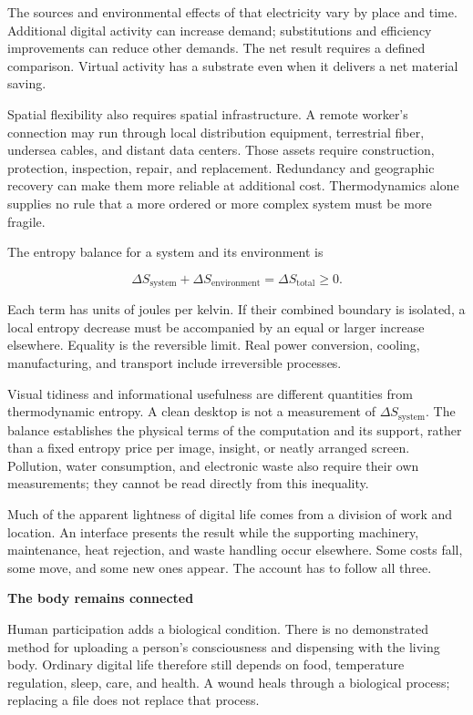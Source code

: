\documentclass[11pt,openany]{book}
\newcommand{\subhead}[1]{\par\medskip\noindent\textbf{#1}\par\nobreak\smallskip}
\begin{document}
The sources and environmental effects of that electricity vary by place and time. Additional digital activity can increase demand; substitutions and efficiency improvements can reduce other demands. The net result requires a defined comparison. Virtual activity has a substrate even when it delivers a net material saving.

Spatial flexibility also requires spatial infrastructure. A remote worker's connection may run through local distribution equipment, terrestrial fiber, undersea cables, and distant data centers. Those assets require construction, protection, inspection, repair, and replacement. Redundancy and geographic recovery can make them more reliable at additional cost. Thermodynamics alone supplies no rule that a more ordered or more complex system must be more fragile.

The entropy balance for a system and its environment is

\begin{equation}
\Delta S_{\mathrm{system}}+\Delta S_{\mathrm{environment}}
=\Delta S_{\mathrm{total}}\geq 0.
\end{equation}

Each term has units of joules per kelvin. If their combined boundary is isolated, a local entropy decrease must be accompanied by an equal or larger increase elsewhere. Equality is the reversible limit. Real power conversion, cooling, manufacturing, and transport include irreversible processes.

Visual tidiness and informational usefulness are different quantities from thermodynamic entropy. A clean desktop is not a measurement of $\Delta S_{\mathrm{system}}$. The balance establishes the physical terms of the computation and its support, rather than a fixed entropy price per image, insight, or neatly arranged screen. Pollution, water consumption, and electronic waste also require their own measurements; they cannot be read directly from this inequality.

Much of the apparent lightness of digital life comes from a division of work and location. An interface presents the result while the supporting machinery, maintenance, heat rejection, and waste handling occur elsewhere. Some costs fall, some move, and some new ones appear. The account has to follow all three.

\subhead{The body remains connected}

Human participation adds a biological condition. There is no demonstrated method for uploading a person's consciousness and dispensing with the living body. Ordinary digital life therefore still depends on food, temperature regulation, sleep, care, and health. A wound heals through a biological process; replacing a file does not replace that process.
\end{document}
